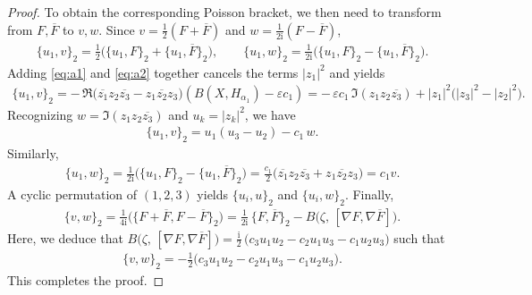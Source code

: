 \documentclass[10pt,a4paper]{amsart}
\begin{document}
\begin{proof}
To obtain the corresponding Poisson bracket, we then need to transform from $F,\overline{F}$ to $v,w$.  Since $v=\frac{1}{2}(F+\overline{F})$ and $w=\frac{1}{2\mathrm{i}}(F-\overline{F})$, \begin{align*}
\{u_1,v\}_2 =\frac{1}{2}\big(\{u_1,F\}_2+\{u_1,\overline{F}\}_2\big),\qquad \{u_1,w\}_2 =\frac{1}{2\mathrm{i}}\big(\{u_1,F\}_2-\{u_1,\overline{F}\}_2\big).
\end{align*} Adding \eqref{eq:a1} and \eqref{eq:a2} together cancels the terms $|z_1|^2$ and yields \begin{align*}
\{u_1,v\}_2 = -\,\Re\Big(\overline{z_1}z_2\overline{z_3}-z_1\overline{z_2}z_3\Big)\left(B(X,H_{\alpha_1})-\varepsilon c_1\right) = -\,\varepsilon c_1\,\Im(z_1z_2\overline{z_3}) +|z_1|^2\big(|z_3|^2-|z_2|^2\big).
\end{align*} Recognizing $w=\Im(z_1z_2\overline{z_3})$ and $u_k=|z_k|^2$, we have \begin{align}
 \{u_1,v\}_2=u_1(u_3-u_2)-c_1\,w . \label{eq:b}
\end{align} Similarly, \begin{align}
\{u_1,w\}_2 =\frac{1}{2\mathrm{i}}\big(\{u_1,F\}_2-\{u_1,\overline{F}\}_2\big) =  \frac{c_1}{2}\big(\overline{z_1}z_2\overline{z_3}+z_1\overline{z_2}z_3\big) =  c_1 v . \label{eq:c}
\end{align} A cyclic permutation of $(1,2,3)$ yields $\{u_i,u\}_2$ and $\{u_i,w\}_2 $. Finally, \begin{align*}
\{v,w\}_2 =\frac{1}{4\mathrm{i}}\big(\{F+\overline{F},F-\overline{F}\}_2\big) =\frac{1}{2\mathrm{i}}\,\{F,\overline{F}\}_2- B \big(\zeta,\,[\nabla F,\nabla\overline{F}]\big).
\end{align*} Here, we deduce that $B\big(\zeta,\,[\nabla F,\nabla\overline{F}]\big) = \frac{\mathrm{i}}{2}\,\Big(c_3 u_1u_2-c_2 u_1u_3-c_1 u_2u_3\Big) $ such that \begin{align}
 \{v,w\}_2=-\frac{1}{2}\Big(c_3 u_1u_2-c_2 u_1u_3-c_1 u_2u_3\Big).
\end{align} This completes the proof.
\end{proof}
\end{document}
